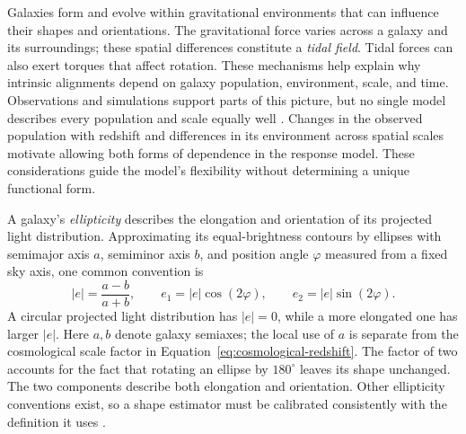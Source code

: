 Galaxies form and evolve within gravitational environments that can
influence their shapes and orientations. The gravitational force varies
across a galaxy and its surroundings; these spatial differences constitute
a \emph{tidal field}. Tidal forces can also exert torques that affect
rotation. These mechanisms help explain why intrinsic alignments depend on
galaxy population, environment, scale, and time. Observations and simulations
support parts of this picture, but no single model describes every
population and scale equally well \citep{2025A&ARv..33....5C}.
Changes in the observed population with redshift and differences in its
environment across spatial scales motivate allowing both forms of
dependence in the response model. These considerations guide the model's
flexibility without determining a unique functional form.

A galaxy's \emph{ellipticity} describes the elongation and orientation of
its projected light distribution. Approximating its equal-brightness
contours by ellipses with semimajor axis $a$, semiminor axis $b$, and
position angle $\varphi$ measured from a fixed sky axis, one common
convention is
\begin{equation}
  |e|=\frac{a-b}{a+b},
  \qquad
  e_1=|e|\cos(2\varphi),
  \qquad
  e_2=|e|\sin(2\varphi).
  \label{eq:image-ellipticity}
\end{equation}
A circular projected light distribution has $|e|=0$, while a more elongated
one has larger $|e|$. Here $a,b$ denote galaxy semiaxes; the local use of $a$
is separate from the cosmological scale factor in
Equation~\eqref{eq:cosmological-redshift}.
The factor of two accounts for the fact that rotating an ellipse by
$180^\circ$ leaves its shape unchanged. The two components describe both
elongation and orientation. Other ellipticity conventions exist, so a shape
estimator must be calibrated consistently with the definition it uses
\citep{2001PhR...340..291B}.

